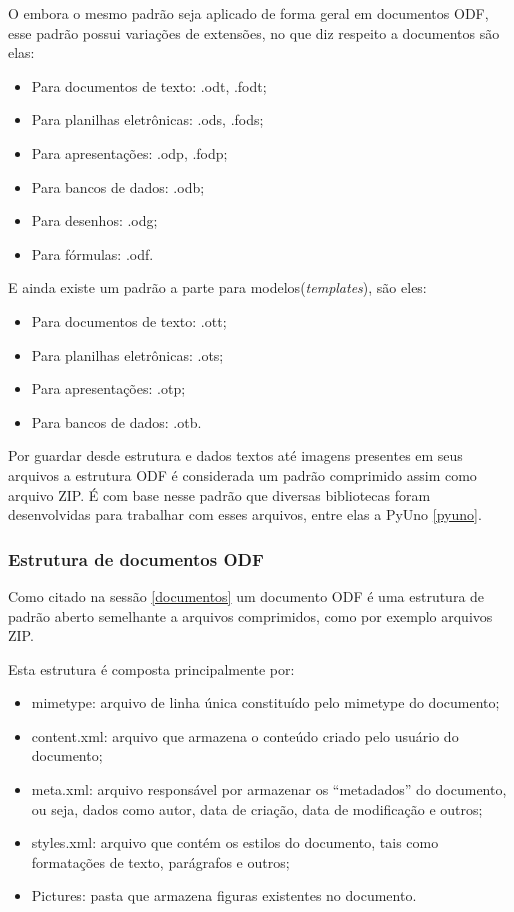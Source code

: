 O embora o mesmo padrão seja aplicado de forma geral em documentos ODF, esse padrão possui variações de extensões, no que diz respeito a documentos são elas:

\begin{itemize}
    \item{Para documentos de texto: .odt, .fodt;}
    \item{Para planilhas eletrônicas: .ods, .fods;}
    \item{Para apresentações: .odp, .fodp;}
    \item{Para bancos de dados: .odb;}
    \item{Para desenhos: .odg;}
    \item{Para fórmulas: .odf.}
\end{itemize}

E ainda existe um padrão a parte para modelos(\textit{templates}), são eles:

\begin{itemize}
    \item{Para documentos de texto: .ott;}
    \item{Para planilhas eletrônicas: .ots;}
    \item{Para apresentações: .otp;}
    \item{Para bancos de dados: .otb.}
\end{itemize}

Por guardar desde estrutura e dados textos até imagens presentes em seus arquivos a estrutura ODF é considerada um padrão comprimido assim como arquivo ZIP. É com base nesse padrão que diversas bibliotecas foram desenvolvidas para trabalhar com esses arquivos, entre elas a PyUno \ref{pyuno}.

\subsubsection{Estrutura de documentos ODF}

Como citado na sessão \ref{documentos} um documento ODF é uma estrutura de padrão aberto semelhante a arquivos comprimidos, como por exemplo arquivos ZIP.

Esta estrutura é composta principalmente por:

\begin{itemize}
    \item{mimetype: arquivo de linha única constituído pelo mimetype do documento;}
    \item{content.xml: arquivo que armazena o conteúdo criado pelo usuário do documento;}
    \item{meta.xml: arquivo responsável por armazenar os ``metadados'' do documento, ou seja, dados como autor, data de criação, data de modificação e outros;}
    \item{styles.xml: arquivo que contém os estilos do documento, tais como formatações de texto, parágrafos e outros;}
    \item{Pictures: pasta que armazena figuras existentes no documento.}
\end{itemize}

